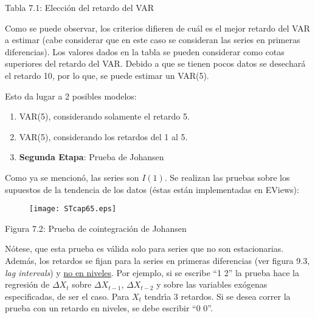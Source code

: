 \begin{center}
Tabla 7.1: Elecci\'{o}n del retardo del VAR
\end{center}

Como se puede observar, los criterios difieren de cu\'{a}l es el mejor 
retardo del VAR a estimar (cabe considerar que en este caso se consideran 
las series en primeras diferencias). Los valores dados en la tabla se pueden 
considerar como cotas superiores del retardo del VAR. Debido a que se tienen 
pocos datos se desechar\'{a} el retardo 10, por lo que, se puede estimar un 
VAR(5). 

Esto da lugar a 2 posibles modelos: 

\begin{enumerate}
\item VAR(5), considerando solamente el retardo 5.
\item VAR(5), considerando los retardos del 1 al 5.
\item \textbf{Segunda Etapa}: Prueba de Johansen
\end{enumerate}

Como ya se mencion\'{o}, las series son $I(1)$. Se realizan las pruebas 
sobre los supuestos de la tendencia de los datos (\'{e}stas est\'{a}n 
implementadas en EViews):

\begin{figure}[H]
\texttt{[image: STcap65.eps]}
\label{fig5}
\end{figure}

\begin{center}
Figura 7.2: Prueba de cointegraci\'{o}n de Johansen
\end{center}

N\'{o}tese, que esta prueba es v\'{a}lida solo para series que no son 
estacionarias. Adem\'{a}s, los retardos se fijan para la series en primeras 
diferencias (ver figura 9.3, \textit{lag intervals}) y \underline {no en niveles}. Por ejemplo, si 
se escribe ``1 2'' la prueba hace la regresi\'{o}n de $\Delta X_{t}$ sobre 
$\Delta X_{t-1}$, $\Delta X_{t-2}$ y sobre las variables ex\'{o}genas 
especificadas, de ser el caso. Para $X_{t}$ tendr\'{\i}a 3 retardos. Si se 
desea correr la prueba con un retardo en niveles, se debe escribir ``0 0''. 

